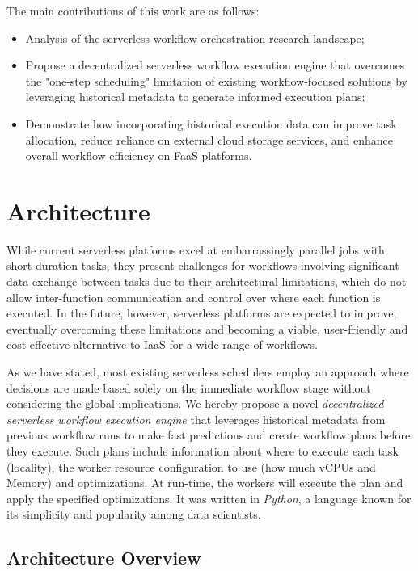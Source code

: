 \documentclass[conference]{IEEEtran}
\begin{document}
The main contributions of this work are as follows:
\begin{itemize}
    \item Analysis of the serverless workflow orchestration research landscape;
    \item Propose a decentralized serverless workflow execution engine that overcomes the "one-step scheduling" limitation of existing workflow-focused solutions by leveraging historical metadata to generate informed execution plans;
    \item Demonstrate how incorporating historical execution data can improve task allocation, reduce reliance on external cloud storage services, and enhance overall workflow efficiency on FaaS platforms.
\end{itemize}


\section{Architecture}
\label{s:architecture}

While current serverless platforms excel at embarrassingly parallel jobs with short-duration tasks, they present challenges for workflows involving significant data exchange between tasks due to their architectural limitations, which do not allow inter-function communication and control over where each function is executed. In the future, however, serverless platforms are expected to improve, eventually overcoming these limitations and becoming a viable, user-friendly and cost-effective alternative to IaaS for a wide range of workflows.

As we have stated, most existing serverless schedulers employ an approach where decisions are made based solely on the immediate workflow stage without considering the global implications. We hereby propose a novel \textit{decentralized serverless workflow execution engine} that leverages historical metadata from previous workflow runs to make fast predictions and create workflow plans before they execute. Such plans include information about where to execute each task (locality), the worker resource configuration to use (how much vCPUs and Memory) and optimizations. At run-time, the workers will execute the plan and apply the specified optimizations. It was written in \textit{Python}, a language known for its simplicity and popularity among data scientists.

\subsection{Architecture Overview}
\end{document}
